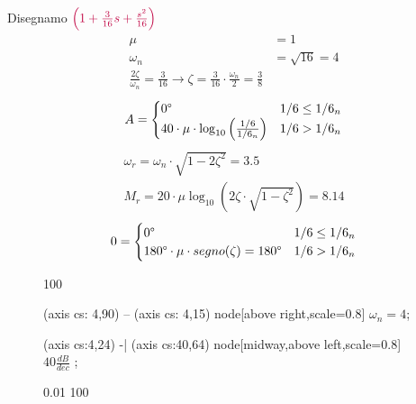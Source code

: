 \documentclass[a4paper]{article}
\begin{document}
\begin{example}
    \vspace{1em}
    \noindent
    Disegnamo \( \color{purple} \left( 1 + \frac{3}{16}s + \frac{s ^2}{16} \right)  \) 
    \[
    \begin{aligned}
      \mu &= 1\\
      \omega_n &= \sqrt{16} = 4\\
      \frac{2 \zeta}{\omega_n} = \frac{3}{16} \to \zeta = \frac{3}{16} \cdot \frac{\omega_n}{2} = \frac{3}{8}
    \end{aligned}
    \] 
    \[
    \begin{aligned}
      A &= \begin{cases}
        0\degree & 1/6 \le 1/6_n\\
        40 \cdot \mu \cdot \log_{10} \left( \frac{1/6}{1/6_n} \right) & 1/6 > 1/6_n
      \end{cases}\\
    \end{aligned}
    \] 
    \[
      \begin{aligned}
        \omega_r = \omega_n \cdot \sqrt{1 - 2 \zeta^2} = 3.5\\
        M_r = 20 \cdot \mu \log_{10} \left( 2 \zeta \cdot \sqrt{1 - \zeta^2} \right) = 8.14
      \end{aligned}
    \] 
    \[
    0 = \begin{cases}
      0\degree & 1/6 \le 1/6_n\\
      180\degree \cdot \mu \cdot segno(\zeta) = 180\degree & 1/6 > 1/6_n
    \end{cases}
    \] 
    \begin{figure}[H]
      \centering
      \begin{BodeMagPlot}[scale=1.5,ytick distance=20,ylabel={Ampiezza (dB)}]{0.01}{100}

         (axis cs: 4,90) -- (axis cs: 4,15) node[above right,scale=0.8] {\( \omega_n = 4 \)};

         (axis cs:4,24) -| (axis cs:40,64) 
        node[midway,above left,scale=0.8] {\( 40 \frac{dB}{dec} \) };
      \end{BodeMagPlot}

      \begin{BodePhPlot}[scale=1.5,ytick distance=90,ylabel={Fase (deg)},xlabel={Frequenza (rad/s)}] {0.01} {100}


\end{BodePhPlot}
\end{figure}
\end{example}
\end{document}
